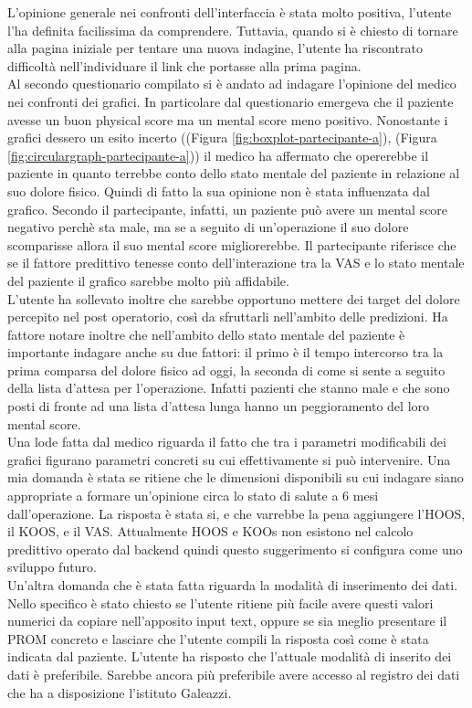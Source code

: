 L'opinione generale nei confronti dell'interfaccia è stata molto positiva, l'utente l'ha definita facilissima da comprendere. Tuttavia, quando si è chiesto di tornare alla pagina iniziale per tentare una nuova indagine, l'utente ha riscontrato difficoltà nell'individuare il link che portasse alla prima pagina. \\
Al secondo questionario compilato si è andato ad indagare l'opinione del medico nei confronti dei grafici. In particolare dal questionario emergeva che il paziente avesse un buon physical score ma un mental score meno positivo. Nonostante i grafici dessero un esito incerto ((Figura \ref{fig:boxplot-partecipante-a}), (Figura \ref{fig:circulargraph-partecipante-a})) il medico ha affermato che opererebbe il paziente in quanto terrebbe conto dello stato mentale del paziente in relazione al suo dolore fisico. Quindi di fatto la sua opinione non è stata influenzata dal grafico. Secondo il partecipante, infatti, un paziente può avere un mental score negativo perchè sta male, ma se a seguito di un'operazione il suo dolore scomparisse allora il suo mental score migliorerebbe. Il partecipante riferisce che se il fattore predittivo tenesse conto dell'interazione tra la VAS e lo stato mentale del paziente il grafico sarebbe molto più affidabile.\\
L'utente ha sollevato inoltre che sarebbe opportuno mettere dei target del dolore percepito nel post operatorio, così da sfruttarli nell'ambito delle predizioni. Ha fattore notare inoltre che nell'ambito dello stato mentale del paziente è importante indagare anche su due fattori: il primo è il tempo intercorso tra la prima comparsa del dolore fisico ad oggi, la seconda di come si sente a seguito della lista d'attesa per l'operazione. Infatti pazienti che stanno male e che sono posti di fronte ad una lista d'attesa lunga hanno un peggioramento del loro mental score. \\
Una lode fatta dal medico riguarda il fatto che tra i parametri modificabili dei grafici figurano parametri concreti su cui effettivamente si può intervenire. Una mia domanda è stata se ritiene che le dimensioni disponibili su cui indagare siano appropriate a formare un'opinione circa lo stato di salute a 6 mesi dall'operazione. La risposta è stata si, e che varrebbe la pena aggiungere l'HOOS, il KOOS, e il VAS. Attualmente HOOS e KOOs non esistono nel calcolo predittivo operato dal backend quindi questo suggerimento si configura come uno sviluppo futuro. \\
Un'altra domanda che è stata fatta riguarda la modalità di inserimento dei dati. Nello specifico è stato chiesto se l'utente ritiene più facile avere questi valori numerici da copiare nell'apposito input text, oppure se sia meglio presentare il PROM concreto e lasciare che l'utente compili la risposta così come è stata indicata dal paziente. L'utente ha risposto che l'attuale modalità di inserito dei dati è preferibile. Sarebbe ancora più preferibile avere accesso al registro dei dati che ha a disposizione l'istituto Galeazzi. 


